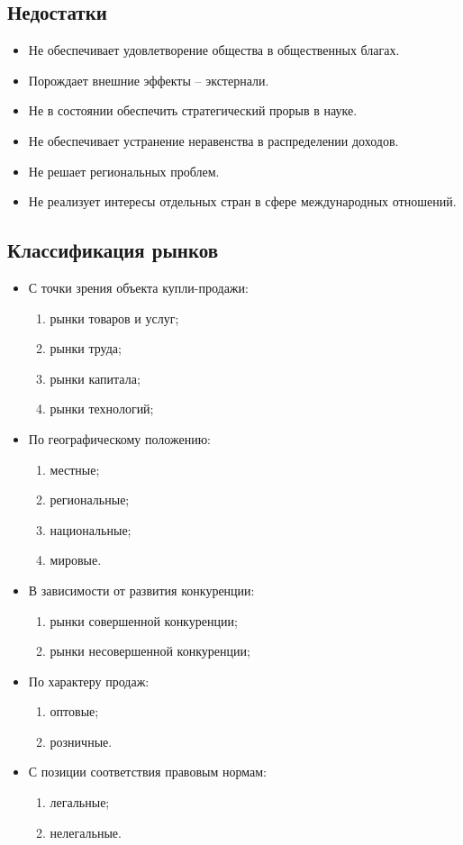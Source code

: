 \subsection{Недостатки}
\begin{itemize}
    \item Не обеспечивает удовлетворение общества в общественных благах.
    \item Порождает внешние эффекты -- экстернали.
    \item Не в состоянии обеспечить стратегический прорыв в науке.
    \item Не обеспечивает устранение неравенства в распределении доходов.
    \item Не решает региональных проблем.
    \item Не реализует интересы отдельных стран в сфере международных отношений.
\end{itemize}

\subsection{Классификация рынков}
\begin{itemize}
    \item С точки зрения объекта купли-продажи:
    \begin{enumerate}
        \item рынки товаров и услуг;
        \item рынки труда;
        \item рынки капитала;
        \item рынки технологий;
    \end{enumerate}
    \item По географическому положению:
    \begin{enumerate}
        \item местные;
        \item региональные;
        \item национальные;
        \item мировые.
    \end{enumerate}
    \item В зависимости от развития конкуренции:
    \begin{enumerate}
        \item рынки совершенной конкуренции;
        \item рынки несовершенной конкуренции;
    \end{enumerate}
    \item По характеру продаж:
    \begin{enumerate}
        \item оптовые;
        \item розничные.
    \end{enumerate}
    \item С позиции соответствия правовым нормам:
    \begin{enumerate}
        \item легальные;
        \item нелегальные.
    \end{enumerate}
\end{itemize}

